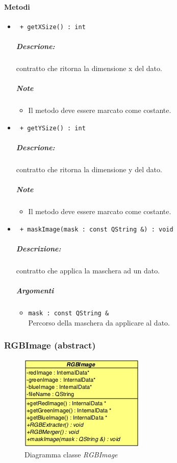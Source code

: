	\paragraph{Metodi}
		\begin{itemize}
			\item \color{blue}\verb! + getXSize() : int !\\
			\color{black}
			\subparagraph{Descrione:} contratto che ritorna la dimensione x del dato.
			\subparagraph{Note}
				\begin{itemize}
					\item Il metodo deve essere marcato come costante.
				\end{itemize}
				
				\item \color{blue}\verb! + getYSize() : int !\\
					\color{black}
					\subparagraph{Descrione:} contratto che ritorna la dimensione y del dato.
					\subparagraph{Note}
						\begin{itemize}
							\item Il metodo deve essere marcato come costante.
						\end{itemize}
						
				\item \color{blue}\verb! + maskImage(mask : const QString &) : void!\\
				\color{black}
				\subparagraph{Descrizione:} contratto che applica la maschera ad un dato.
				\subparagraph{Argomenti}
					\begin{itemize}
						\item \color{RoyalPurple}\verb!mask : const QString &!\\
						\color{black}Percorso della maschera\g{} da applicare al dato. 
					\end{itemize}
				
			
		\end{itemize}
		
	
\pagebreak	

\color{black}
\subsubsection{RGBImage (abstract)}
\label{RGBImage}
\begin{figure}[!h]
\centering
			\includegraphics[scale=1]{./Content/Immagini/modelCore/RGBImage.png}
			\caption{Diagramma classe \textsl{RGBImage}}
			\label{RGBImage_img}
\end{figure}


